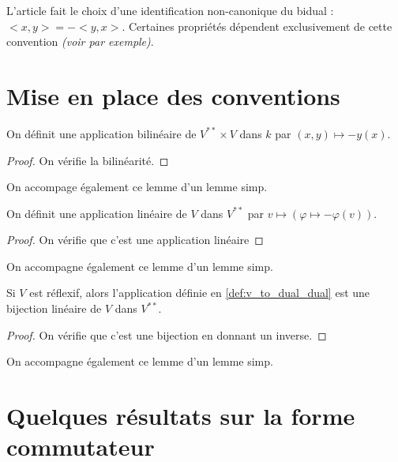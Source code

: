 L'article fait le choix d'une identification non-canonique du bidual :
$<x,y>=-<y,x>$. Certaines propriétés dépendent exclusivement de cette
convention \textit{(voir par exemple)}.

\section{Mise en place des conventions}

\begin{definition}
    \label{def:form_dual}
    \uses{}
    \leanok 

    On définit une application bilinéaire de $V^{**}\times V$ dans $k$ par 
    $(x,y)\mapsto - y(x)$.
    \begin{proof}
        \leanok
        On vérifie la bilinéarité.
    \end{proof}
\end{definition}
On accompage également ce lemme d'un lemme simp.

\begin{definition}
    \label{def:v_to_dual_dual}
    \uses{}
    \leanok 

    On définit une application linéaire de $V$ dans $V^{**}$ par 
    $v\mapsto (\varphi\mapsto -\varphi(v))$.
    \begin{proof}
        \leanok
        On vérifie que c'est une application linéaire
    \end{proof}
\end{definition}
On accompagne également ce lemme d'un lemme simp.

\begin{proposition}
    \label{def:identification_dual}
    \leanok 

    Si $V$ est réflexif, alors l'application définie en \ref{def:v_to_dual_dual} est une 
    bijection linéaire de $V$ dans $V^{**}$.
    \begin{proof}
        \leanok
        On vérifie que c'est une bijection en donnant un inverse.
    \end{proof}
\end{proposition}
On accompagne également ce lemme d'un lemme simp.

\section{Quelques résultats sur la forme commutateur}

